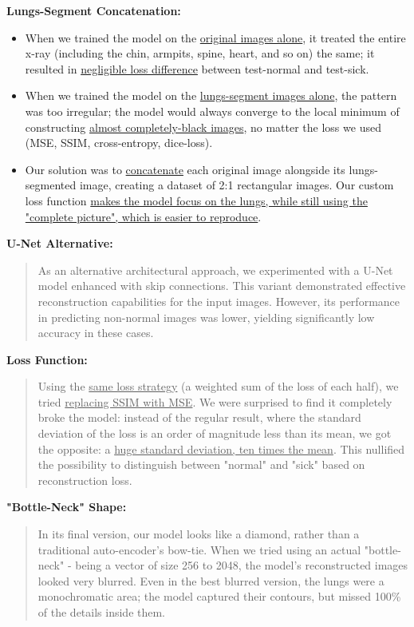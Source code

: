 \documentclass{article}
\begin{document}
\textbf{Lungs-Segment Concatenation:} 
\begin{itemize}
\item When we trained the model on the \uline{original images alone}, it treated the entire x-ray (including the chin, armpits, spine, heart, and so on) the same; it resulted in \uline{negligible loss difference} between test-normal and test-sick.
\item When we trained the model on the \uline{lungs-segment images alone}, the pattern was too irregular; the model would always converge to the local minimum of constructing \uline{almost completely-black images}, no matter the loss we used (MSE, SSIM, cross-entropy, dice-loss).
\item Our solution was to \uline{concatenate} each original image alongside its lungs-segmented image, creating a dataset of 2:1 rectangular images. Our custom loss function \uline{makes the model focus on the lungs, while still using the "complete picture", which is easier to reproduce}.
\end{itemize}

\textbf{U-Net Alternative:}
\begin{quote}
As an alternative architectural approach, we experimented with a U-Net model enhanced with skip connections. This variant demonstrated effective reconstruction capabilities for the input images. However, its performance in predicting non-normal images was lower, yielding significantly low accuracy in these cases.
\end{quote}

\textbf{Loss Function:} 
\begin{quote}
Using the \uline{same loss strategy} (a weighted sum of the loss of each half), we tried \uline{replacing SSIM with MSE}. We were surprised to find it completely broke the model: instead of the regular result, where the standard deviation of the loss is an order of magnitude less than its mean, we got the opposite: a \uline{huge standard deviation, ten times the mean}. This nullified the possibility to distinguish between "normal" and "sick" based on reconstruction loss.
\end{quote}

\textbf{"Bottle-Neck" Shape:} 
\begin{quote}
In its final version, our model looks like a diamond, rather than a traditional auto-encoder's bow-tie. When we tried using an actual "bottle-neck" - being a vector of size 256 to 2048, the model's reconstructed images looked very blurred. Even in the best blurred version, the lungs were a monochromatic area; the model captured their contours, but missed 100\% of the details inside them.
\end{quote}
\end{document}
